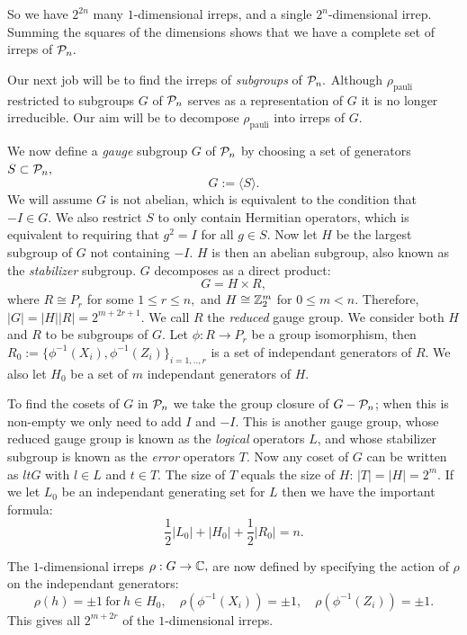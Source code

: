 \documentclass[12pt,notitlepage,longbibliography,nofootinbib,tightenlines]{revtex4}
\begin{document}
So we have $2^{2n}$ many $1$-dimensional irreps,
and a single $2^n$-dimensional irrep.
Summing the squares of the dimensions
shows that we have a complete set of irreps of $\mathcal{P}_n.$

Our next job will be to find the irreps of {\it subgroups} of $\mathcal{P}_n.$
Although $\rho_{\mathrm{pauli}}$
restricted to subgroups $G$ of $\mathcal{P}_n$ serves as a representation
of $G$ it is no longer irreducible.
Our aim will be to decompose $\rho_{\mathrm{pauli}}$ into irreps
of $G.$

We now define a {\it gauge} subgroup $G$ of $\mathcal{P}_n$
by choosing a set of generators $S\subset \mathcal{P}_n,$
$$ G := \langle S\rangle.$$
We will assume $G$ is not abelian, which is
equivalent to the condition that $-I\in G.$
We also restrict $S$ to only contain Hermitian operators,
which is equivalent to requiring that $g^2=I$ for all $g\in S.$
Now let $H$ be the largest subgroup of $G$ not containing
$-I.$
$H$ is then an abelian subgroup,
also known as the {\it stabilizer} subgroup.
$G$ decomposes as a direct product:
$$G = H\times R,$$
where $R\cong P_r$ for some $1\le r\le n,$
and $H\cong \mathbb{Z}_2^{m}$ for $0\le m<n.$
Therefore, $|G| = |H| |R| = 2^{m+2r+1}.$
We call $R$ the {\it reduced} gauge group.
We consider both $H$ and $R$ to be subgroups of $G.$
Let $\phi:R\to P_r$ be a group isomorphism,
then $R_0 := \{\phi^{-1}(X_i), \phi^{-1}(Z_i)\}_{i=1,..,r}$
is a set of independant generators of $R.$
We also let $H_0$ be a set of $m$ independant generators of $H.$

To find the cosets of $G$ in $\mathcal{P}_n$ we take
the group closure of $G-\mathcal{P}_n$; when this is non-empty
we only need to add $I$ and $-I.$
This is another
gauge group, whose reduced gauge group is known as
the {\it logical} operators $L$, and whose 
stabilizer subgroup is known as the {\it error} operators $T.$
Now any coset of $G$ can be written as $ltG$ with
$l\in L$ and $t\in T.$
The size of $T$ equals the size of $H$: $|T|=|H|=2^m.$
If we let $L_0$ be an independant generating set for $L$
then we have the important formula:
\begin{equation}\label{formula}
\frac{1}{2}|L_0| + |H_0| + \frac{1}{2}|R_0| = n.
\end{equation}

The $1$-dimensional irreps $\rho:G\to \mathbb{C},$
are now defined by
specifying the action of $\rho$ on the independant generators:
$$
    \rho(h)=\pm 1\ \mbox{for}\ h\in H_0,
    \quad \rho(\phi^{-1}(X_i)) = \pm 1,\quad \rho(\phi^{-1}(Z_i)) = \pm 1.
$$
This gives all $2^{m+2r}$ of the $1$-dimensional irreps.
\end{document}
